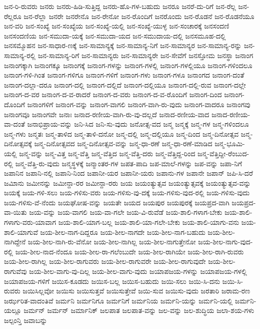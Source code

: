 {ಜನ-ರಿ-ರುವರು
ಜನರು
ಜನರು-ಹಿಡಿ-ಸುತ್ತಿದ್ದ
ಜನರು-ಹೊ-ಗಳ-ಬಹುದು
ಜನರೂ
ಜನರೆ-ದು-ರಿಗೆ
ಜನ-ರೆಲ್ಲ
ಜನ-ರೆಲ್ಲರೂ
ಜನ-ರೆಲ್ಲಾ
ಜನರೇ
ಜನರೇನೊ
ಜನ-ರೇನೋ
ಜನ-ರೊಂದಿಗೆ
ಜನರೊಂದು
ಜನ-ರೊಡನೆ
ಜನ-ರೊಡನೆಯೂ
ಜನ-ವರಿ
ಜನ-ಸಂಖ್ಯೆ
ಜನ-ಸಂಖ್ಯೆಯ
ಜನ-ಸಂಖ್ಯೆ-ಯಲ್ಲಿ
ಜನ-ಸಂಖ್ಯೆ-ಯುಳ್ಳ
ಜನ-ಸಂಚಾರಕ್ಕೆ
ಜನಸಂದಣಿ
ಜನಸಂದಣಿಯ
ಜನ-ಸಮುದಾ-ಯಕ್ಕೆ
ಜನ-ಸಮುದಾ-ಯದ
ಜನ-ಸಮುದಾಯ-ದಲ್ಲಿ
ಜನಸಮೂಹ-ದಲ್ಲಿ
ಜನಸಮ್ಮೊಹನ
ಜನ-ಸಾಧಾರ-ಣಕ್ಕೆ
ಜನ-ಸಾಮಾನ್ಯಕ್ಕೆ
ಜನ-ಸಾಮಾನ್ಯ-ನಿಗೆ
ಜನ-ಸಾಮಾನ್ಯರ
ಜನ-ಸಾಮಾನ್ಯ-ರನ್ನು
ಜನ-ಸಾಮಾನ್ಯ-ರಲ್ಲಿ
ಜನ-ಸಾಮಾನ್ಯ-ರಿಗೆ
ಜನ-ಸಾಮಾನ್ಯರು
ಜನ-ಸಾಮಾನ್ಯರೇ
ಜನ-ಸೇವೆಗೆ
ಜನಸ್ತೋಮ
ಜನಸ್ಥಾ
ಜನಾಂಗ
ಜನಾಂಗಕ್ಕಾಗಿ
ಜನಾಂಗಕ್ಕೂ
ಜನಾಂಗಕ್ಕೆ
ಜನಾಂಗ-ಗಳನ್ನು
ಜನಾಂಗ-ಗಳಲ್ಲಿ
ಜನಾಂಗ-ಗಳಲ್ಲಿಯೂ
ಜನಾಂಗ-ಗಳಿಂದಲೂ
ಜನಾಂಗ-ಗಳಿ-ಗಿಂತ
ಜನಾಂಗ-ಗಳಿಗೂ
ಜನಾಂಗ-ಗಳಿಗೆ
ಜನಾಂಗ-ಗಳು
ಜನಾಂಗ-ಗಳೂ
ಜನಾಂಗದ
ಜನಾಂಗ-ದಂತೆ
ಜನಾಂಗ-ದಲ್ಲಾ-ದರೂ
ಜನಾಂಗ-ದಲ್ಲಿ
ಜನಾಂಗ-ದಲ್ಲಿದೆ
ಜನಾಂಗ-ದಲ್ಲಿಯೂ
ಜನಾಂಗ-ದಲ್ಲಿ-ರುವ
ಜನಾಂಗ-ದಲ್ಲೇ
ಜನಾಂಗ-ದ-ವರ
ಜನಾಂಗ-ದ-ವ-ರಾದರೆ
ಜನಾಂಗ-ದ-ವರು
ಜನಾಂಗ-ದ-ವ-ರೊಂದಿಗೆ
ಜನಾಂಗ-ದಿಂದ
ಜನಾಂಗ-ದೊಂದಿಗೆ
ಜನಾಂಗಳಿಗೆ
ಜನಾಂಗ-ವನ್ನು
ಜನಾಂಗ-ವಾಗಲಿ
ಜನಾಂಗ-ವಾಗಿ-ರು-ವುದು
ಜನಾಂಗ-ವಾದರೂ
ಜನಾಂಗವು
ಜನಾಂಗವೂ
ಜನಾಂಗವೇ
ಜನಾಃ
ಜನಾದ-ರಣೀಯ-ವಾಗಿ-ರು-ವು-ದಲ್ಲದೆ
ಜನಾದ-ರಣೀಯ-ವಾದ
ಜನಾದ-ರಣೀಯ-ವಾ-ದಂತೆ
ಜನಾಭಿಪ್ರಾಯ-ವನ್ನು
ಜನಿ-ಸಿದ
ಜನಿ-ಸು-ವುದು
ಜನೋತ್ಸ-ವದ
ಜನ್ಮ
ಜನ್ಮಕ್ಕೆ
ಜನ್ಮ-ಗಳ
ಜನ್ಮ-ಗಳಿಂದಲೂ
ಜನ್ಮ-ಗಳು
ಜನ್ಮತಃ
ಜನ್ಮ-ತಾಳಿದ
ಜನ್ಮ-ತಾಳಿ-ದನೋ
ಜನ್ಮ-ದಲ್ಲಿ
ಜನ್ಮ-ದಲ್ಲಿಯೂ
ಜನ್ಮ-ದಿಂದ
ಜನ್ಮ-ದಿನೋತ್ಸವ
ಜನ್ಮ-ದಿನೋತ್ಸವಕ್ಕೆ
ಜನ್ಮ-ದಿನೋತ್ಸವದ
ಜನ್ಮ-ದಿನೋತ್ಸವ-ವನ್ನು
ಜನ್ಮ-ಧಾ-ರಣೆ
ಜನ್ಮ-ಧಾ-ರಣೆ-ಮಾಡಿದ
ಜನ್ಮ-ಭೂಮಿ-ಯಲ್ಲಿ
ಜನ್ಮ-ವನ್ನು
ಜನ್ಮ-ವಿತ್ತ
ಜನ್ಮ-ವೆತ್ತಿ
ಜನ್ಮ-ವೆತ್ತಿದ
ಜನ್ಮ-ವೆತ್ತಿ-ದರು
ಜನ್ಮ-ವೆತ್ತಿದ್ದ-ರಿಂದ
ಜನ್ಮ-ವೆತ್ತಿದ್ದೀ-ರೆಂಬುದ-ರಲ್ಲಿ
ಜನ್ಮ-ವೆತ್ತಿ-ರು-ವುದು
ಜನ್ಮಸ್ಥಳಕ್ಕೆ
ಜನ್ಮಾಂತರ-ಗಳ
ಜಪತ-ಪಾದಿ
ಜಪ-ಮಾಲೆ-ಗಳನ್ನು
ಜಪ-ವನ್ನು
ಜಪಾ-ನಿಗೆ
ಜಪಾನಿನ
ಜಪಾನಿ-ನಲ್ಲಿ
ಜಪಾನಿ-ನಿಂದ
ಜಪಾನೀ-ಯರ
ಜಪಾನೀ-ಯರು
ಜಪಾನು-ಗಳ
ಜಪಾನೇ
ಜಪಾನ್
ಜಪಿ-ಸಿ-ದರೆ
ಜಮಿಾನು
ಜಮೀನನ್ನು
ಜಮೀನ್ದಾ-ರರ
ಜಮೀನ್ದಾ-ರರು
ಜಯ
ಜಯಂತ್ಯುತ್ಸವ
ಜಯಂತ್ಯುತ್ಸವಕ್ಕೆ
ಜಯಂತ್ಯುತ್ಸವ-ವನ್ನು
ಜಯಕ್ಕೆ
ಜಯ-ಗಳಿ-ಸಲು
ಜಯ-ಗಳಿಸು-ವರು
ಜಯ-ಗಳಿಸು-ವು-ದಕ್ಕೆ
ಜಯ-ಗಳಿಸು-ವುದ-ರಲ್ಲಿ
ಜಯ-ಗಳಿಸು-ವುದು
ಜಯ-ಗಳಿಸು-ವೆ-ನೆಂದು
ಜಯಘೋಷ-ವನ್ನು
ಜಯತೇ
ಜಯದ
ಜಯಪುರ
ಜಯಪುರಕ್ಕೆ
ಜಯಪ್ರದ-ವಾಗಿ
ಜಯಪ್ರದ-ವಾ-ಯಿತು
ಜಯ-ವನ್ನು
ಜಯ-ವಾಗಲಿ
ಜಯ-ವಾ-ಗಲೇ
ಜಯ-ವಿ-ರುವೆಡೆ
ಜಯ-ಶಾಲಿ-ಗಳಾಗ-ಬೇಕು
ಜಯ-ಶಾಲಿ-ಗಳಾಗು-ವರು-ಯಾವಾಗ
ಜಯ-ಶಾಲಿ-ಯಾಗ-ಬಲ್ಲ
ಜಯ-ಶಾಲಿ-ಯಾ-ಗಲೇ-ಬೇಕು
ಜಯ-ಶಾಲಿ-ಯಾಗು-ವನು
ಜಯ-ಶಾಲಿ-ಯಾಗುವೆ
ಜಯ-ಶೀಲ-ನಾಗ-ದಿದ್ದರೂ
ಜಯ-ಶೀಲ-ನಾಗದೇ
ಜಯ-ಶೀಲ-ನಾಗ-ಬಹುದು
ಜಯ-ಶೀಲ-ನಾಗಿದ್ದೇನೆ
ಜಯ-ಶೀಲ-ನಾಗಿ-ರು-ವೆನೋ
ಜಯ-ಶೀಲ-ನಾಗಿಲ್ಲ
ಜಯ-ಶೀಲ-ನಾಗುತ್ತೇನೋ
ಜಯ-ಶೀಲ-ನಾಗು-ವುದ-ರಲ್ಲಿ
ಜಯ-ಶೀಲ-ನಾದ-ನೆಂದೂ
ಜಯ-ಶೀಲ-ರಾ-ಗಲೆಂಬುದೇ
ಜಯ-ಶೀಲ-ರಾಗಿಯೇ
ಜಯ-ಶೀಲ-ರಾಗಿ-ರುವರು
ಜಯ-ಶೀಲ-ರಾಗಿಲ್ಲ
ಜಯ-ಶೀಲ-ರಾಗುವರು
ಜಯ-ಶೀಲ-ರಾಗುವರೇ
ಜಯ-ಶೀಲ-ರಾಗುವುದೇ
ಜಯ-ಶೀಲ-ರಾಗುವೆವು
ಜಯ-ಶೀಲ-ವಾಗು-ವು-ದಿಲ್ಲ
ಜಯ-ಶೀಲ-ವಾಗು-ವುದು
ಜಯಾಪಜಯ-ಗಳನ್ನು
ಜಯಾಪಜಯ-ಗಳಲ್ಲಿ
ಜಯಾಪಜಯ-ಗಳಿಗೆ
ಜಯಿಸ-ಕೂಡದು
ಜಯಿಸ-ಬಲ್ಲ
ಜಯಿಸ-ಬಹುದು
ಜಯಿ-ಸಲು
ಜಯಿ-ಸಿ-ದನು
ಜಯಿ-ಸಿ-ರುವರು
ಜಯಿಸಿಲ್ಲವೋ
ಜಯಿಸು
ಜಯಿಸುತ್ತವೆ
ಜಯಿಸುತ್ತೇವೆ
ಜಯಿ-ಸುವ
ಜಯಿಸು-ವುದು
ಜರತಾರಿ
ಜರಾಮ-ರಣ
ಜರ್ಝರಿತ-ವಾದಂತಿವೆ
ಜರ್ಮನಿ
ಜರ್ಮನಿಗೂ
ಜರ್ಮನಿಗೆ
ಜರ್ಮನಿಯ
ಜರ್ಮನಿ-ಯನ್ನು
ಜರ್ಮನಿ-ಯಲ್ಲಿ
ಜರ್ಮನಿ-ಯಲ್ಲೂ
ಜರ್ಮನ್
ಜರ್ಮನ್
ಜರ್ಮಾನಿಕ್
ಜಲಪಾತ
ಜಲಪಾತ-ವನ್ನು
ಜಲ-ವನ್ನು
ಜಲ-ಶುದ್ಧಿಯ
ಜಲಾ-ಶಯ-ಗಳು
ಜಲ್ಪಂನ್ತಿ
ಜವಾಬನ್ನು
}
